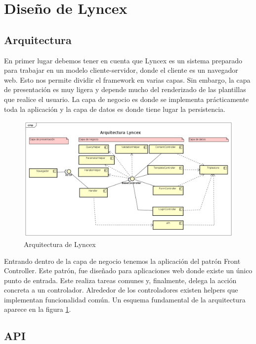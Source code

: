 \documentclass[openright,twoside,12pt]{book}
\begin{document}
\section{Diseño de Lyncex}

\subsection{Arquitectura}
En primer lugar debemos tener en cuenta que Lyncex es un sistema preparado para trabajar en un modelo cliente-servidor, donde el cliente es un navegador web. Esto nos permite dividir el framework en varias capas. Sin embargo, la capa de presentación es muy ligera y depende mucho del renderizado de las plantillas que realice el usuario. La capa de negocio es donde se implementa prácticamente toda la aplicación y la capa de datos es donde tiene lugar la persistencia. 

\begin{figure}
    \centering
    \includegraphics[width=\textwidth]{arquitectura.png}
    \caption{Arquitectura de Lyncex}
    \label{fig:arquitectura}
\end{figure}

Entrando dentro de la capa de negocio tenemos la aplicación del patrón Front Controller.
Este patrón, fue diseñado para aplicaciones web donde existe un único punto de entrada. Este realiza tareas comunes y, finalmente, delega la acción concreta a un controlador. Alrededor de los controladores existen helpers que implementan funcionalidad común. Un esquema fundamental de la arquitectura aparece en la figura \ref{fig:arquitectura}.

\subsection{API}
\end{document}
